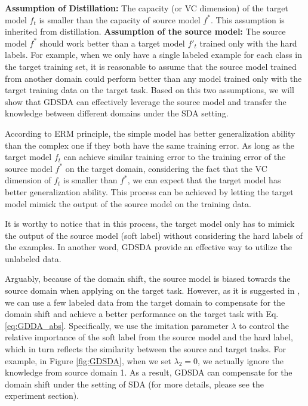 \textbf{Assumption of Distillation:} The capacity (or VC dimension) of the target model $f_t$ is smaller than the capacity of source model $f^*$. This assumption is inherited from distillation.
\textbf{Assumption of the source model:} The source model $f^*$ should work better than a target model $f'_t$ trained only with the hard labels. For example, when we only have a single labeled example for each class in the target training set, it is reasonable to assume that the source model trained from another domain could perform better than any model trained only with the target training data on the target task. Based on this two assumptions, we will show that GDSDA can effectively leverage the source model and transfer the knowledge between different domains under the SDA setting.

According to ERM principle\cite{vapnik1999overview}, the simple model has better generalization ability than the complex one if they both have the same training error.
As long as the target model $f_t$ can achieve similar training error to the training error of the source model $f^*$ on the target domain, considering the fact that the VC dimension of $f_t$ is smaller than $f^*$, we can expect that the target model has better generalization ability. This process can be achieved by letting the target model mimick the output of the source model on the training data.

It is worthy to notice that in this process, the target model only has to mimick the output of the source model (soft label) without considering the hard labels of the examples. In another word, GDSDA provide an effective way to utilize the unlabeled data.

Arguably, because of the domain shift, the source model is biased towards the source domain when applying on the target task. However, as it is suggested in \cite{hinton2015distilling}, we can use a few labeled data from the target domain to compensate for the domain shift and achieve a better performance on the target task with Eq. \eqref{eq:GDDA_abs}. Specifically, we use the imitation parameter $\lambda$ to control the relative importance of the soft label from the source model and the hard label, which in turn reflects the similarity between the source and target tasks. 
For example, in Figure \ref{fig:GDSDA}, when we set $\lambda_2=0$, we actually ignore the knowledge from source domain 1.
As a result, GDSDA can compensate for the domain shift under the setting of SDA (for more details, please see the experiment section).

